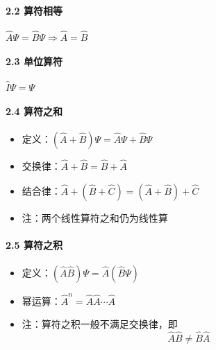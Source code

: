 \documentclass[UTF8,twocolumn]{ctexart}
\providecommand{\tightlist}{%
  \setlength{\itemsep}{0pt}\setlength{\parskip}{0pt}}
\let\oldparagraph\paragraph
\renewcommand{\paragraph}[1]{\oldparagraph{#1}\mbox{}}
\begin{document}
\hypertarget{ux7b97ux7b26ux76f8ux7b49}{%
\paragraph{ 2.2 算符相等}\label{ux7b97ux7b26ux76f8ux7b49}}

\begin{center}
\(\hat{A}\Psi=\hat{B}\Psi\Rightarrow\hat{A}=\hat{B}\)
\end{center}

\hypertarget{ux5355ux4f4dux7b97ux7b26}{%
\paragraph{ 2.3 单位算符}\label{ux5355ux4f4dux7b97ux7b26}}

\begin{center}
\(\hat{I}\Psi=\Psi\)
\end{center}

\hypertarget{ux7b97ux7b26ux4e4bux548c}{%
\paragraph{ 2.4 算符之和}\label{ux7b97ux7b26ux4e4bux548c}}

\begin{itemize}
\tightlist
\item
  定义：\((\hat{A}+\hat{B})\Psi=\hat{A}\Psi+\hat{B}\Psi\)
\item
  交换律：\(\hat{A}+\hat{B}=\hat{B}+\hat{A}\)
\item
  结合律：\(\hat{A}+(\hat{B}+\hat{C})=(\hat{A}+\hat{B})+\hat{C}\)
\item
  注：两个线性算符之和仍为线性算
\end{itemize}

\hypertarget{ux7b97ux7b26ux4e4bux79ef}{%
\paragraph{ 2.5 算符之积}\label{ux7b97ux7b26ux4e4bux79ef}}

\begin{itemize}
\tightlist
\item
  定义：\((\hat{A}\hat{B})\Psi=\hat{A}(\hat{B}\Psi)\)
\item
  幂运算：\(\hat{A}^n=\hat{A}\hat{A}\cdots\hat{A}\)
\item
  注：算符之积一般不满足交换律，即
    \[\hat{A}\hat{B}\neq\hat{B}\hat{A}\]
\end{itemize}
\end{document}
